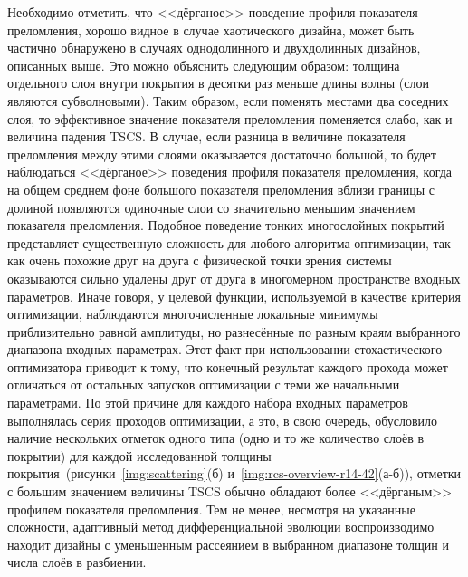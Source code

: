 Необходимо отметить, что <<дёрганое>> поведение профиля показателя
преломления, хорошо видное в случае хаотического дизайна, может быть
частично обнаружено в случаях однодолинного и двухдолинных дизайнов,
описанных выше.  Это можно объяснить следующим образом: толщина
отдельного слоя внутри покрытия в десятки раз меньше длины волны (слои
являются субволновыми).  Таким образом, если поменять местами два
соседних слоя, то эффективное значение показателя преломления
поменяется слабо, как и величина падения TSCS.  В случае, если разница
в величине показателя преломления между этими слоями оказывается
достаточно большой, то будет наблюдаться <<дёрганое>> поведения
профиля показателя преломления, когда на общем среднем фоне большого
показателя преломления вблизи границы с долиной появляются одиночные
слои со значительно меньшим значением показателя преломления.  Подобное
поведение тонких многослойных покрытий представляет существенную
сложность для любого алгоритма оптимизации, так как очень похожие друг
на друга с физической точки зрения системы оказываются сильно удалены
друг от друга в многомерном пространстве входных параметров.  Иначе
говоря, у целевой функции, используемой в качестве критерия
оптимизации, наблюдаются многочисленные локальные минимумы
приблизительно равной амплитуды, но разнесённые по разным краям
выбранного диапазона входных параметрах.  Этот факт при использовании
стохастического оптимизатора приводит к тому, что конечный результат
каждого прохода может отличаться от остальных запусков оптимизации с
теми же начальными параметрами.  По этой причине для каждого набора
входных параметров выполнялась серия проходов оптимизации, а это, в
свою очередь, обусловило наличие нескольких отметок одного типа (одно
и то же количество слоёв в покрытии) для каждой исследованной толщины
покрытия~(рисунки~\ref{img:scattering}(б)
и~\ref{img:rcs-overview-r14-42}(а-б)), отметки с большим значением
величины TSCS обычно обладают более <<дёрганым>> профилем показателя
преломления.  Тем не менее, несмотря на указанные сложности,
адаптивный метод дифференциальной эволюции воспроизводимо находит
дизайны с уменьшенным рассеянием в выбранном диапазоне толщин и числа
слоёв в разбиении.

